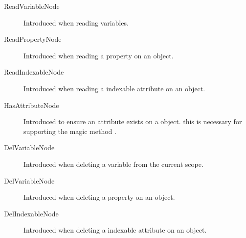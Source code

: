\begin{description}
	\item[ReadVariableNode ] Introduced when reading variables.
	\item[ReadPropertyNode ] Introduced when reading a property on an object.
	\item[ReadIndexableNode ] Introduced when reading a indexable attribute on an object.
	\item[HasAttributeNode ] Introduced to ensure an attribute exists on a object. this is necessary for supporting the magic method .
	\item[DelVariableNode ] Introduced when deleting a variable from the current scope.
	\item[DelVariableNode ] Introduced when deleting a property on an object.
	\item[DelIndexableNode ] Introduced when deleting a indexable attribute on an object.


\end{description}
